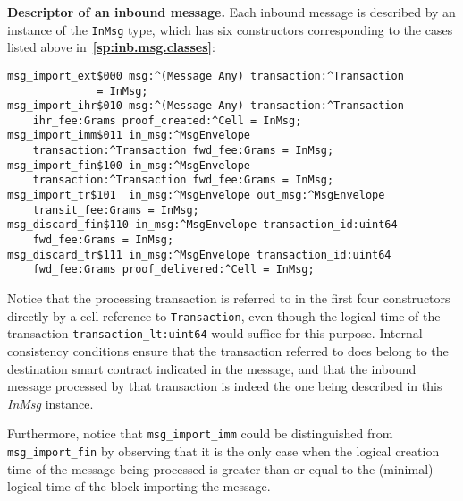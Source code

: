 \documentclass[12pt,oneside]{article}
\def\makepoint#1{\medbreak\noindent{\bf #1.\ }}
\def\nxsubpoint{\refstepcounter{subsubsection}%
  \smallbreak\makepoint{\thesubsubsection}}
\def\refpoint#1{{\rm\textbf{\ref{#1}}}}
\let\ptref=\refpoint
\def\emb#1{\textbf{#1.}}
\begin{document}
\nxsubpoint\label{sp:in.msg.d}\emb{Descriptor of an inbound message}
Each inbound message is described by an instance of the \texttt{InMsg} type, which has six constructors corresponding to the cases listed above in~\ptref{sp:inb.msg.classes}:
\begin{verbatim}
msg_import_ext$000 msg:^(Message Any) transaction:^Transaction
              = InMsg;
msg_import_ihr$010 msg:^(Message Any) transaction:^Transaction
    ihr_fee:Grams proof_created:^Cell = InMsg;
msg_import_imm$011 in_msg:^MsgEnvelope
    transaction:^Transaction fwd_fee:Grams = InMsg;
msg_import_fin$100 in_msg:^MsgEnvelope
    transaction:^Transaction fwd_fee:Grams = InMsg;
msg_import_tr$101  in_msg:^MsgEnvelope out_msg:^MsgEnvelope
    transit_fee:Grams = InMsg;
msg_discard_fin$110 in_msg:^MsgEnvelope transaction_id:uint64
    fwd_fee:Grams = InMsg;
msg_discard_tr$111 in_msg:^MsgEnvelope transaction_id:uint64
    fwd_fee:Grams proof_delivered:^Cell = InMsg;
\end{verbatim}
Notice that the processing transaction is referred to in the first four constructors directly by a cell reference to \texttt{Transaction}, even though the logical time of the transaction \texttt{transaction\_lt:uint64} would suffice for this purpose. Internal consistency conditions ensure that the transaction referred to does belong to the destination smart contract indicated in the message, and that the inbound message processed by that transaction is indeed the one being described in this {\em InMsg\/} instance.

Furthermore, notice that \texttt{msg\_import\_imm} could be distinguished from \texttt{msg\_import\_fin} by observing that it is the only case when the logical creation time of the message being processed is greater than or equal to the (minimal) logical time of the block importing the message.
\end{document}
